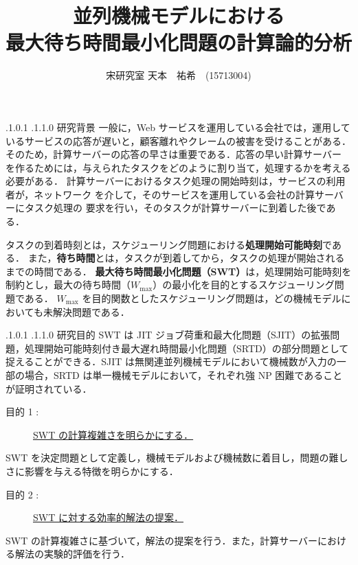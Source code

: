 \documentclass[oneside, 10pt, twocolumn]{jarticle}
\title{\bf{\rm
並列機械モデルにおける\\最大待ち時間最小化問題の計算論的分析}}
\author{宋研究室
\hspace{15pt}
天本　祐希　(15713004)}
\date{}
\makeatletter
\def\section{\@startsection {section}{1}{\z@}{-3.5ex plus -1ex minus
-.2ex}{2.3 ex plus .2ex}{\large\bf}}
\renewcommand{\section}{
\@startsection{section}{1}{\z@}
{.1\Cvs \@plus.0\Cdp \@minus.1\Cdp}%
{.1\Cvs \@plus.1\Cdp \@minus.0\Cdp}%
{\reset@font\large\bfseries}}      %
\makeatother
\begin{document}
\maketitle
\thispagestyle{empty}
\section{研究背景}
一般に，Web サービスを運用している会社では，運用しているサービスの応答が遅いと，顧客離れやクレームの被害を受けることがある．
そのため，計算サーバーの応答の早さは重要である．応答の早い計算サーバー
を作るためには，与えられたタスクをどのように割り当て，処理するかを考える必要がある．
計算サーバーにおけるタスク処理の開始時刻は，サービスの利用者が，ネットワーク
を介して，そのサービスを運用している会社の計算サーバーにタスク処理の
要求を行い，そのタスクが計算サーバーに到着した後である．

タスクの到着時刻とは，スケジューリング問題における{\bf 処理開始可能時刻}である．
また，{\bf 待ち時間}とは，タスクが到着してから，タスクの処理が開始されるまでの時間である．
{\bf 最大待ち時間最小化問題（SWT）}は，処理開始可能時刻を制約とし，最大の待ち時間（\mbox{\boldmath $W_{\max}$}）の最小化を目的とするスケジューリング問題である．
$W_{\max}$ を目的関数としたスケジューリング問題は，どの機械モデルにおいても未解決問題である．


\section{研究目的}
SWT は JIT ジョブ荷重和最大化問題（SJIT）の拡張問題，処理開始可能時刻付き最大遅れ時間最小化問題（SRTD）の部分問題として捉えることができる．SJIT は無関連並列機械モデルにおいて機械数が入力の一部の場合，SRTD は単一機械モデルにおいて，それぞれ強 NP 困難であることが証明されている\cite{SJIT}\cite{SRTD}．
\begin{description}
  \item[目的 1 :]
  \underline{SWT の計算複雑さを明らかにする．}
\end{description}
SWT を決定問題として定義し，機械モデルおよび機械数に着目し，問題の難しさに影響を与える特徴を明らかにする．

\begin{description}
  \item[目的 2 :]
  \underline{SWT に対する効率的解法の提案．}
\end{description}
SWT の計算複雑さに基づいて，解法の提案を行う．また，計算サーバーにおける解法の実験的評価を行う．
\end{document}
